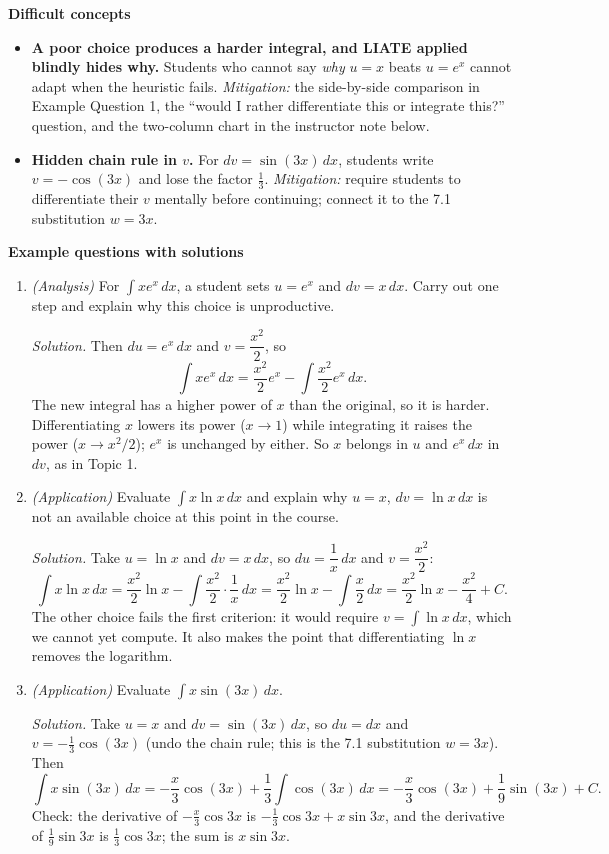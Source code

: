 \documentclass[11pt]{article}
\begin{document}
\textbf{Difficult concepts}
\begin{itemize}
\item \textbf{A poor choice produces a harder integral, and LIATE applied blindly hides why.} Students who cannot say \emph{why} $u=x$ beats $u=e^x$ cannot adapt when the heuristic fails. \emph{Mitigation:} the side-by-side comparison in Example Question 1, the ``would I rather differentiate this or integrate this?'' question, and the two-column chart in the instructor note below.
\item \textbf{Hidden chain rule in $v$.} For $dv=\sin(3x)\,dx$, students write $v=-\cos(3x)$ and lose the factor $\tfrac13$. \emph{Mitigation:} require students to differentiate their $v$ mentally before continuing; connect it to the 7.1 substitution $w=3x$.
\end{itemize}

\textbf{Example questions with solutions}
\begin{enumerate}
\item \emph{(Analysis)} For $\int xe^x\,dx$, a student sets $u = e^x$ and $dv = x\,dx$. Carry out one step and explain why this choice is unproductive.

\textit{Solution.} Then $du = e^x\,dx$ and $v = \dfrac{x^2}{2}$, so
\[ \int xe^x\,dx = \frac{x^2}{2}e^x - \int \frac{x^2}{2}e^x\,dx. \]
The new integral has a higher power of $x$ than the original, so it is harder. Differentiating $x$ lowers its power ($x\to 1$) while integrating it raises the power ($x\to x^2/2$); $e^x$ is unchanged by either. So $x$ belongs in $u$ and $e^x\,dx$ in $dv$, as in Topic 1.

\item \emph{(Application)} Evaluate $\displaystyle\int x\ln x\,dx$ and explain why $u=x$, $dv=\ln x\,dx$ is not an available choice at this point in the course.

\textit{Solution.} Take $u = \ln x$ and $dv = x\,dx$, so $du = \dfrac{1}{x}\,dx$ and $v = \dfrac{x^2}{2}$:
\[ \int x\ln x\,dx = \frac{x^2}{2}\ln x - \int \frac{x^2}{2}\cdot\frac1x\,dx = \frac{x^2}{2}\ln x - \int \frac{x}{2}\,dx = \frac{x^2}{2}\ln x - \frac{x^2}{4} + C. \]
The other choice fails the first criterion: it would require $v=\int\ln x\,dx$, which we cannot yet compute. It also makes the point that differentiating $\ln x$ removes the logarithm.

\item \emph{(Application)} Evaluate $\displaystyle\int x\sin(3x)\,dx$.

\textit{Solution.} Take $u = x$ and $dv = \sin(3x)\,dx$, so $du = dx$ and $v = -\tfrac13\cos(3x)$ (undo the chain rule; this is the 7.1 substitution $w=3x$). Then
\[ \int x\sin(3x)\,dx = -\frac{x}{3}\cos(3x) + \frac13\int\cos(3x)\,dx = -\frac{x}{3}\cos(3x) + \frac19\sin(3x) + C. \]
Check: the derivative of $-\frac{x}{3}\cos 3x$ is $-\frac13\cos 3x + x\sin 3x$, and the derivative of $\frac19\sin 3x$ is $\frac13\cos 3x$; the sum is $x\sin 3x$.
\end{enumerate}
\end{document}
